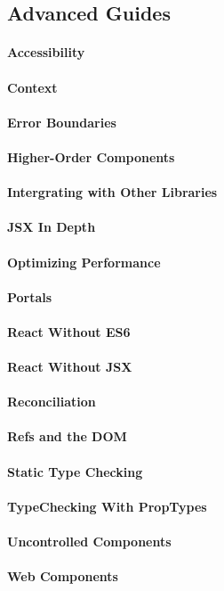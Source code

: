 \documentclass{book}
\begin{document}
\begin{CJK*}{UTF8}{gbsn}
\chapter{Advanced Guides}
\subsubsection{Accessibility}
\subsubsection{Context}
\subsubsection{Error Boundaries}
\subsubsection{Higher-Order Components}
\subsubsection{Intergrating with Other Libraries}
\subsubsection{JSX In Depth}
\subsubsection{Optimizing Performance}
\subsubsection{Portals}
\subsubsection{React Without ES6}
\subsubsection{React Without JSX}
\subsubsection{Reconciliation}
\subsubsection{Refs and the DOM}
\subsubsection{Static Type Checking}
\subsubsection{TypeChecking With PropTypes}
\subsubsection{Uncontrolled Components}
\subsubsection{Web Components}
\end{CJK*}
\end{document}
